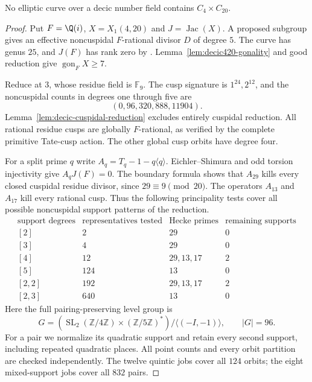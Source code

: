 \begin{proposition}\label{prop:decic420}
No elliptic curve over a decic number field contains $C_4\times C_{20}$.
\end{proposition}
\begin{proof}
Put $F=\Q(i)$, $X=X_1(4,20)$ and $J=\operatorname{Jac}(X)$.
A proposed subgroup gives an effective noncuspidal $F$-rational
divisor $D$ of degree $5$. The curve has genus $25$, and
$J(F)$ has rank zero by \cite[Theorem~4.1]{DS}.
Lemma~\ref{lem:decic420-gonality} and good reduction give
$\operatorname{gon}_F X\ge7$.

Reduce at $3$, whose residue field is $\mathbb F_9$.
The cusp signature is $1^{24},2^{12}$, and the noncuspidal
counts in degrees one through five are
\[
 (0,96,320,888,11904).
\]
Lemma~\ref{lem:decic-cuspidal-reduction} excludes entirely
cuspidal reduction. All rational residue cusps are globally
$F$-rational, as verified by the complete primitive Tate-cusp
action. The other global cusp orbits have degree four.

For a split prime $q$ write $A_q=T_q-1-q\langle q\rangle$.
Eichler--Shimura and odd torsion injectivity give $A_qJ(F)=0$.
The boundary formula shows that $A_{29}$ kills every closed
cuspidal residue divisor, since $29\equiv9\pmod{20}$.
The operators $A_{13}$ and $A_{17}$ kill every rational cusp.
Thus the following principality tests cover all possible
noncuspidal support patterns of the reduction.
\[
\begin{array}{c|r|l|r}
\text{support degrees}&\text{representatives tested}&
\text{Hecke primes}&\text{remaining supports}\\\hline
{[2]}&2&29&0\\
{[3]}&4&29&0\\
{[4]}&12&29,13,17&2\\
{[5]}&124&13&0\\
{[2,2]}&192&29,13,17&2\\
{[2,3]}&640&13&0
\end{array}
\]
Here the full pairing-preserving level group is
\[
 G=(\operatorname{SL}_2(\mathbb Z/4\mathbb Z)
       \times(\mathbb Z/5\mathbb Z)^*)/\langle(-I,-1)\rangle,
 \qquad |G|=96.
\]
For a pair we normalize its quadratic support and retain every
second support, including repeated quadratic places.
All point counts and every orbit partition are checked
independently. The twelve quintic jobs cover all $124$ orbits;
the eight mixed-support jobs cover all $832$ pairs.


\end{proof}
